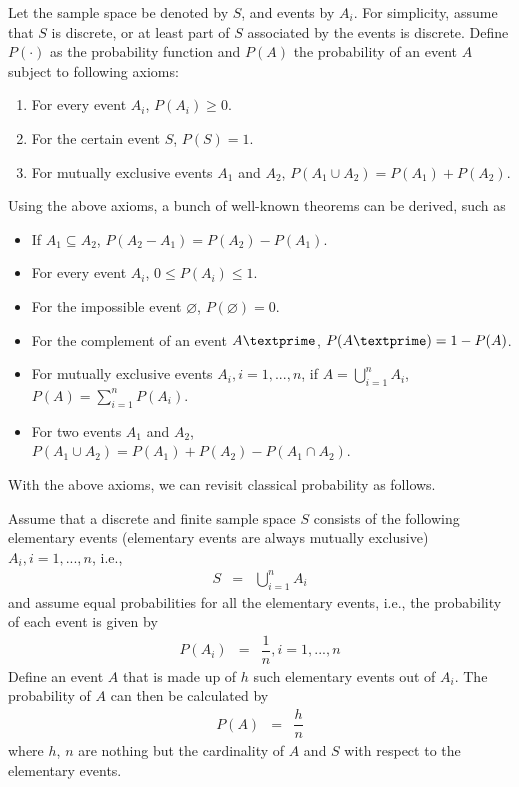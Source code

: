 Let the sample space be denoted by $S$, and events by $A_i$. For simplicity, assume that $S$ is discrete, or at least part of $S$ associated by the events is discrete. Define $P(\cdot)$ as the probability function and $P(A)$ the probability of an event $A$ subject to following axioms:
\begin{enumerate}
  \item For every event $A_i$, $P(A_i)\geq 0$.
  \item For the certain event $S$, $P(S)=1$.
  \item For mutually exclusive events $A_1$ and $A_2$, $P\left(A_1\cup A_2\right) = P(A_1)+P(A_2)$.
\end{enumerate}

Using the above axioms, a bunch of well-known theorems can be derived, such as
\begin{itemize}
  \item If $A_1 \subseteq A_2$, $P(A_2-A_1) = P(A_2)-P(A_1)$.
  \item For every event $A_i$, $0\leq P(A_i) \leq 1$.
  \item For the impossible event $\varnothing$, $P(\varnothing)=0$.
  \item For the complement of an event $A\textprime$, $P(A\textprime)=1-P(A)$.
  \item For mutually exclusive events $A_i, i=1,...,n$, if $A = \bigcup_{i=1}^{n} A_i$, $P(A) = \sum_{i=1}^{n}P(A_i)$.
  \item For two events $A_1$ and $A_2$, $P\left(A_1\cup A_2\right) = P(A_1)+P(A_2)-P\left(A_1\cap A_2\right)$.
\end{itemize}

With the above axioms, we can revisit classical probability as follows.

Assume that a discrete and finite sample space $S$ consists of the following elementary events (elementary events are always mutually exclusive) $A_i, i=1,...,n$, i.e.,
\begin{eqnarray}
  S &=& \bigcup_{i=1}^{n} A_i \nonumber
\end{eqnarray}
and assume equal probabilities for all the elementary events, i.e., the probability of each event is given by
\begin{eqnarray}
  P(A_i) &=& \dfrac{1}{n}, i=1,...,n \nonumber
\end{eqnarray}
Define an event $A$ that is made up of $h$ such elementary events out of $A_i$. The probability of $A$ can then be calculated by
\begin{eqnarray}
  P(A) &=& \dfrac{h}{n} \nonumber
\end{eqnarray}
where $h$, $n$ are nothing but the cardinality of $A$ and $S$ with respect to the elementary events.


